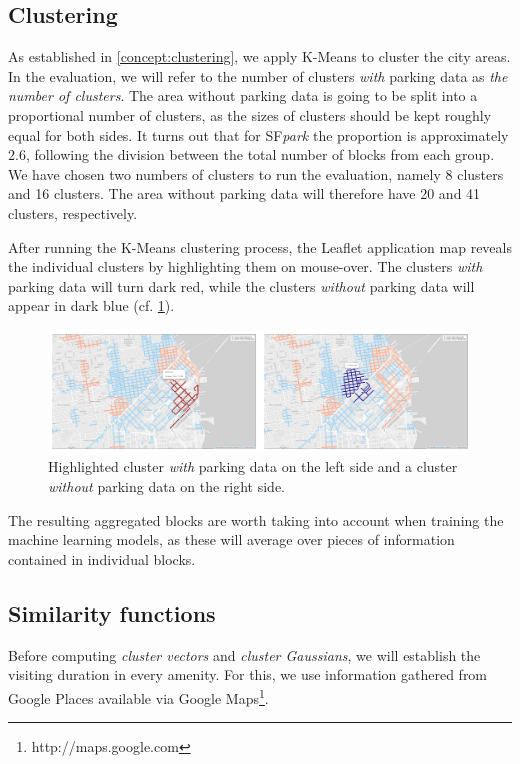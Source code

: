 \subsection{Clustering}
\label{experimental_setup:clustering}
As established in \cref{concept:clustering}, we apply K-Means to cluster the city areas.
In the evaluation, we will refer to the number of clusters \textit{with} parking data as \textit{the number of clusters}.
The area without parking data is going to be split into a proportional number of clusters, as the sizes of clusters should be kept roughly equal for both sides.
It turns out that for SF\textit{park} the proportion is approximately $2.6$, following the division between the total number of blocks from each group.
We have chosen two numbers of clusters to run the evaluation, namely 8 clusters and 16 clusters.
The area without parking data will therefore have 20 and 41 clusters, respectively. 

After running the K-Means clustering process, the Leaflet application map reveals the individual clusters by highlighting them on mouse-over.
The clusters \textit{with} parking data will turn dark red, while the clusters \textit{without} parking data will appear in dark blue (cf. \cref{fig:highlighted_collage}). 

\begin{figure}[!ht]
	\centering
	\includegraphics[width=\textwidth]{graphics/highlighted_collage.png}
	\caption{Highlighted cluster \textit{with} parking data on the left side and a cluster \textit{without} parking data on the right side.}
	\label{fig:highlighted_collage}
\end{figure}

The resulting aggregated blocks are worth taking into account when training the machine learning models, as these will average over pieces of information contained in individual blocks. 

\subsection{Similarity functions}
\label{experimental_setup:urban_measure}
Before computing \textit{cluster vectors} and \textit{cluster Gaussians}, we will establish the visiting duration in every amenity.
For this, we use information gathered from Google Places available via Google Maps\footnote{http://maps.google.com}.


